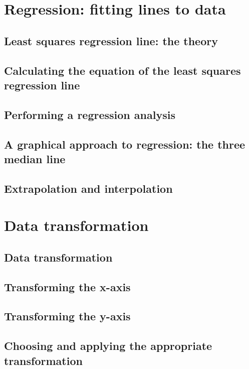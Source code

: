\documentclass[a4paper,11pt]{article}
\begin{document}
\newpage

\section{Regression: fitting lines to data}
\begin{outline}

\0
\subsection{Least squares regression line: the theory}

\0
\subsection{Calculating the equation of the least squares regression line}

\0
\subsection{Performing a regression analysis}

\0
\subsection{A graphical approach to regression: the three median line}

\0
\subsection{Extrapolation and interpolation}

\end{outline}

\newpage

\section{Data transformation}
\begin{outline}

\0
\subsection{Data transformation}

\0
\subsection{Transforming the x-axis}

\0
\subsection{Transforming the y-axis}

\0
\subsection{Choosing and applying the appropriate transformation}

\end{outline}
\end{document}
